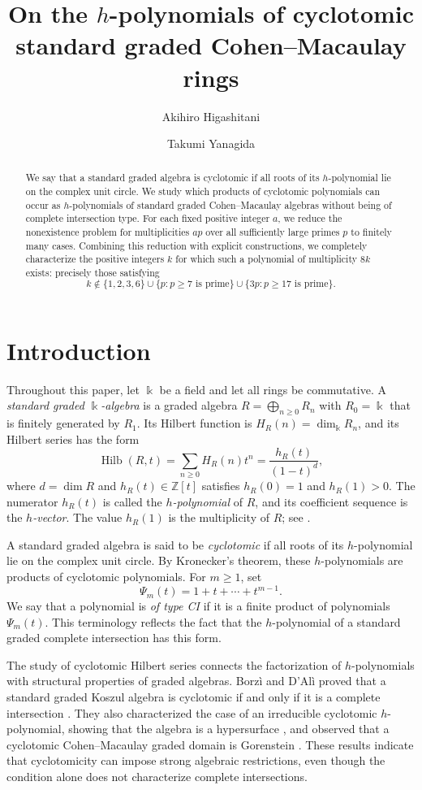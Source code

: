 \documentclass[11pt,a4paper]{amsart}
\title[Cyclotomic $h$-polynomials of Cohen--Macaulay rings]{On the $h$-polynomials of cyclotomic standard graded Cohen--Macaulay rings}
\author{Akihiro Higashitani}
\author{Takumi Yanagida}
\theoremstyle{definition}
\theoremstyle{remark}
\newcommand{\kk}{\Bbbk}
\newcommand{\ZZ}{\mathbb Z}
\DeclareMathOperator{\Hilb}{Hilb}
\begin{document}
\begin{abstract}
We say that a standard graded algebra is cyclotomic if all roots of its $h$-polynomial lie on the complex unit circle. We study which products of cyclotomic polynomials can occur as $h$-polynomials of standard graded Cohen--Macaulay algebras without being of complete intersection type. For each fixed positive integer $a$, we reduce the nonexistence problem for multiplicities $ap$ over all sufficiently large primes $p$ to finitely many cases. Combining this reduction with explicit constructions, we completely characterize the positive integers $k$ for which such a polynomial of multiplicity $8k$ exists: precisely those satisfying
\[k\notin\{1,2,3,6\}\cup\{p:p\ge7\text{ is prime}\}\cup\{3p:p\ge17\text{ is prime}\}.\]
\end{abstract}
\maketitle

\section{Introduction}
Throughout this paper, let $\kk$ be a field and let all rings be commutative. A \emph{standard graded $\kk$-algebra} is a graded algebra $R=\bigoplus_{n\ge0}R_n$ with $R_0=\kk$ that is finitely generated by $R_1$. Its Hilbert function is $H_R(n)=\dim_{\kk}R_n$, and its Hilbert series has the form
\[\Hilb(R,t)=\sum_{n\ge0}H_R(n)t^n=\frac{h_R(t)}{(1-t)^d},\]
where $d=\dim R$ and $h_R(t)\in\ZZ[t]$ satisfies $h_R(0)=1$ and $h_R(1)>0$. The numerator $h_R(t)$ is called the \emph{$h$-polynomial} of $R$, and its coefficient sequence is the \emph{$h$-vector}. The value $h_R(1)$ is the multiplicity of $R$; see \cite[Section~4.1]{BrunsHerzog}.

A standard graded algebra is said to be \emph{cyclotomic} if all roots of its $h$-polynomial lie on the complex unit circle. By Kronecker's theorem, these $h$-polynomials are products of cyclotomic polynomials.
For $m\ge1$, set \[\Psi_m(t)=1+t+\cdots+t^{m-1}.\]
We say that a polynomial is \emph{of type CI} if it is a finite product of polynomials $\Psi_m(t)$. This terminology reflects the fact that the $h$-polynomial of a standard graded complete intersection has this form.

The study of cyclotomic Hilbert series connects the factorization of $h$-polynomials with structural properties of graded algebras. Borz\`i and D'Al\`i proved that a standard graded Koszul algebra is cyclotomic if and only if it is a complete intersection \cite[Theorem~3.9]{BorziDAli}. They also characterized the case of an irreducible cyclotomic $h$-polynomial, showing that the algebra is a hypersurface \cite[Theorem~4.3]{BorziDAli}, and observed that a cyclotomic Cohen--Macaulay graded domain is Gorenstein \cite[Proposition~2.7]{BorziDAli}. These results indicate that cyclotomicity can impose strong algebraic restrictions, even though the condition alone does not characterize complete intersections.
\end{document}
